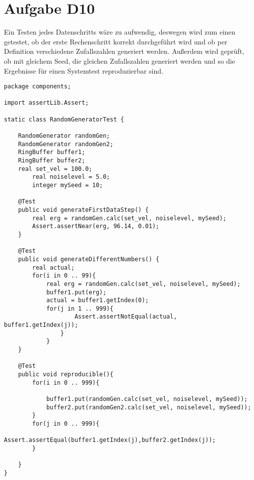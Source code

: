 
\chapter{Aufgabe D10}
Ein Testen jedes Datenschritts wäre zu aufwendig, deswegen wird zum einen getestet, ob der erste Rechenschritt korrekt durchgeführt wird und ob per Definition verschiedene Zufallszahlen generiert werden.  Außerdem wird geprüft, ob mit gleichem Seed, die gleichen Zufallszahlen generiert werden und so die Ergebnisse für einen Systemtest reproduzierbar sind.
\begin{lstlisting}
package components;

import assertLib.Assert;

static class RandomGeneratorTest {
    
    RandomGenerator randomGen;
    RandomGenerator randomGen2;
    RingBuffer buffer1;
    RingBuffer buffer2;
    real set_vel = 100.0;
		real noiselevel = 5.0;
		integer mySeed = 10;
    
    @Test
    public void generateFirstDataStep() {
	    real erg = randomGen.calc(set_vel, noiselevel, mySeed);
	    Assert.assertNear(erg, 96.14, 0.01);
    }
    
    @Test
    public void generateDifferentNumbers() {
	    real actual;
	    for(i in 0 .. 99){
	        real erg = randomGen.calc(set_vel, noiselevel, mySeed);
	        buffer1.put(erg);
	        actual = buffer1.getIndex(0);
	        for(j in 1 .. 999){
	            	Assert.assertNotEqual(actual, buffer1.getIndex(j));
	            }
	        }
    }
    
    @Test
    public void reproducible(){
	    for(i in 0 .. 999){
	  
	        buffer1.put(randomGen.calc(set_vel, noiselevel, mySeed));     
	        buffer2.put(randomGen2.calc(set_vel, noiselevel, mySeed));
	    }
	    for(j in 0 .. 999){
	        Assert.assertEqual(buffer1.getIndex(j),buffer2.getIndex(j));
	    }
    
    }
}


\end{lstlisting}